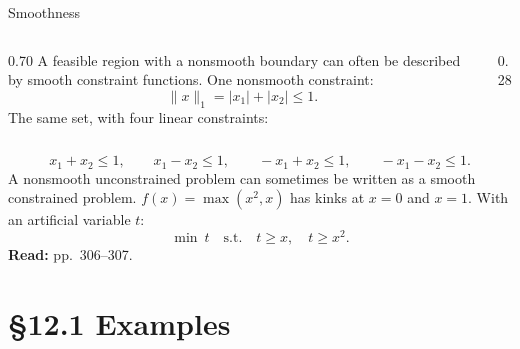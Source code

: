 \documentclass[aspectratio=169,12pt]{beamer}
\newcommand{\eqn}[1]{\text{\small(#1)}}
\newcommand{\readbook}[1]{{\color{red}\textbf{Read:} #1}}
\begin{document}
\begin{frame}{Smoothness}
  \begin{columns}[T,totalwidth=\textwidth]
    \begin{column}{0.70\textwidth}
      A feasible region with a nonsmooth boundary can often be described by smooth constraint
      functions. One nonsmooth constraint:
      \[ \|x\|_{1}=|x_{1}|+|x_{2}|\le 1 . \tag{12.5} \]
      The same set, with four linear constraints:
    \end{column}
    \begin{column}{0.28\textwidth}
      \centering
    \end{column}
  \end{columns}
  \[ x_{1}+x_{2}\le 1,\qquad x_{1}-x_{2}\le 1,\qquad -x_{1}+x_{2}\le 1,\qquad -x_{1}-x_{2}\le 1 . \tag{12.6} \]
  A nonsmooth unconstrained problem can sometimes be written as a smooth constrained problem.
  $f(x)=\max(x^{2},x)$ \eqn{12.7} has kinks at $x=0$ and $x=1$. With an artificial variable $t$:
  \[ \min\ t\quad\text{s.t.}\quad t\ge x,\quad t\ge x^{2} . \tag{12.8} \]
  \readbook{pp.~306--307.}
\end{frame}

\section{\S12.1 Examples}
\end{document}
